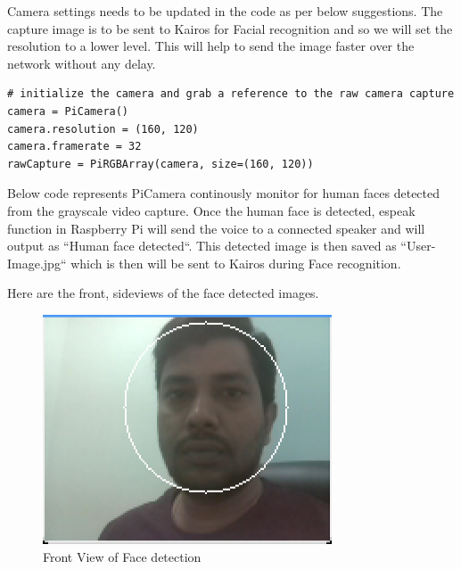 \documentclass[sigconf]{acmart}
\begin{document}
Camera settings needs to be updated in the code as per below suggestions. The capture image is to be sent to Kairos for Facial recognition and so we will set the resolution to a lower level. This will help to send the image faster over the network without any delay.

\begin{lstlisting}
# initialize the camera and grab a reference to the raw camera capture
camera = PiCamera()
camera.resolution = (160, 120)
camera.framerate = 32
rawCapture = PiRGBArray(camera, size=(160, 120))
\end{lstlisting}

Below code represents PiCamera continously monitor for human faces detected from the grayscale video capture. Once the human face is detected, espeak function in Raspberry Pi will send the voice to a connected speaker and will output as ``Human face detected``. This detected image is then saved as ``User-Image.jpg`` which is then will be sent to Kairos during Face recognition.

Here are the front, sideviews of the face detected images.

\begin{figure}[ht!]
  \includegraphics[width=\columnwidth]{images/Face-detect-frontview.png}
  \caption{Front View of Face detection}
\end{figure}
\end{document}
